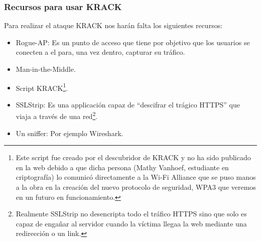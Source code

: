 \subsubsection{Recursos para usar KRACK}
Para realizar el ataque KRACK nos harán falta los siguientes recursos:
\begin{itemize}
	\item Rogue-AP: Es un punto de acceso que tiene por objetivo que los usuarios se conecten a el para, una vez dentro, capturar su tráfico.
	\item Man-in-the-Middle.
	\item Script KRACK\footnote{Este script fue creado por el descubridor de KRACK y no ha sido publicado en la web debido a que dicha persona (Mathy Vanhoef, estudiante en criptografía) lo comunicó directamente a la Wi-Fi Alliance que se puso manos a la obra en la creación del nuevo protocolo de seguridad, WPA3 que veremos en un futuro en funcionamiento.}.
	\item SSLStrip: Es una applicación capaz de ``descifrar el trágico HTTPS'' que viaja a través de una red\footnote{Realmente SSLStrip no desencripta todo el tráfico HTTPS sino que solo es capaz de engañar al servidor cuando la víctima llegaa la web mediante una redirección o un link.}.
	\item Un sniffer: Por ejemplo Wireshark.
\end{itemize}